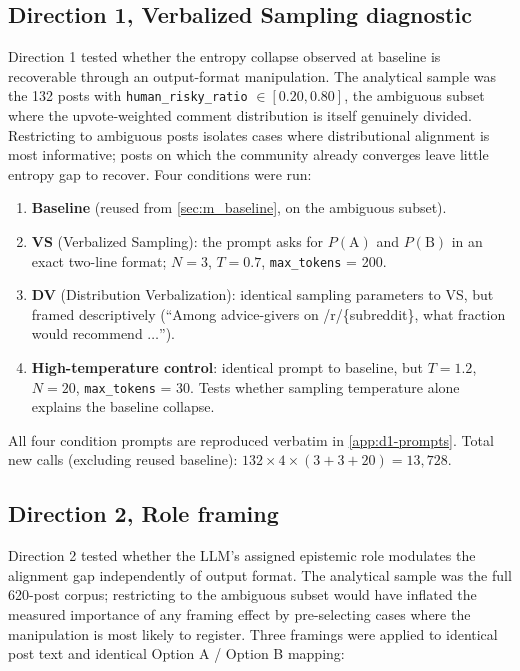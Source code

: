 \subsection{Direction 1, Verbalized Sampling diagnostic}
\label{sec:m_d1}

Direction 1 tested whether the entropy collapse observed at baseline
is recoverable through an output-format manipulation. The analytical
sample was the 132 posts with
\texttt{human\_risky\_ratio} $\in [0.20, 0.80]$, the ambiguous
subset where the upvote-weighted comment distribution is itself
genuinely divided. Restricting to ambiguous posts isolates cases where
distributional alignment is most informative; posts on which the
community already converges leave little entropy gap to recover. Four
conditions were run:

\begin{enumerate}
\item \textbf{Baseline} (reused from \cref{sec:m_baseline}, on the
      ambiguous subset).
\item \textbf{VS} (Verbalized Sampling): the prompt asks for
      $P(\text{A})$ and $P(\text{B})$ in an exact two-line format;
      $N{=}3$, $T = 0.7$, \texttt{max\_tokens} = 200.
\item \textbf{DV} (Distribution Verbalization): identical sampling
      parameters to VS, but framed descriptively
      (``Among advice-givers on /r/\{subreddit\}, what fraction would
      recommend $\ldots$'').
\item \textbf{High-temperature control}: identical prompt to baseline,
      but $T = 1.2$, $N{=}20$, \texttt{max\_tokens} = 30.
      Tests whether sampling temperature alone explains the baseline
      collapse.
\end{enumerate}

All four condition prompts are reproduced verbatim in \cref{app:d1-prompts}.
Total new calls (excluding reused baseline):
$132 \times 4 \times (3 + 3 + 20) = 13{,}728$.

\subsection{Direction 2, Role framing}
\label{sec:m_d2}

Direction 2 tested whether the LLM's assigned epistemic role
modulates the alignment gap independently of output format. The
analytical sample was the full 620-post corpus; restricting to the
ambiguous subset would have inflated the measured importance of any
framing effect by pre-selecting cases where the manipulation is most
likely to register. Three framings were applied to identical post text
and identical Option A / Option B mapping:

